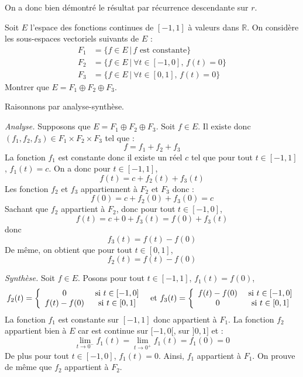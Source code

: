 \documentclass[a4paper,twoside,french,11pt]{VcCours}
\begin{document}
\medskip

On a donc bien démontré le résultat par récurrence descendante sur $r$.

\begin{Exercice}{} Soit $E$ l'espace des fonctions continues de $[-1,1]$ à valeurs dans $\mathbb{R}$. On considère les sous-espaces vectoriels suivants de $E$ :
\begin{align*}
F_1 &= \lbrace f \in E \, \vert \, f{\text{~est constante}} \rbrace \\
F_2 &= \lbrace f \in E \, \vert \ \forall t \in [ - 1,0], \,  f(t)  = 0 \rbrace \\
F_3 & = \lbrace f \in E \, \vert \ \forall t \in [0,1], \,  f(t) = 0 \rbrace 
\end{align*}
Montrer que $E = F_1 \oplus F_2 \oplus F_3$.
\end{Exercice} 


\corr Raisonnons par analyse-synthèse.

\medskip

\textit{Analyse.} Supposons que $E = F_1 \oplus F_2 \oplus F_3$. Soit $f \in E$. Il existe donc $(f_1,f_2,f_3) \in F_1 \times F_2 \times F_3$ tel que :
$$ f = f_1+ f_2+ f_3$$
La fonction $f_1$ est constante donc il existe un réel $c$ tel que pour tout $t \in [-1,1]$, $f_1(t)=c$. On a donc pour $t \in [-1,1]$,
$$ f(t) = c + f_2(t) + f_3(t)$$
Les fonction $f_2$ et $f_3$ appartiennent à $F_2$ et $F_3$ donc :
$$ f(0) = c + f_2(0)+ f_3(0) = c$$
Sachant que $f_2$ appartient à $F_2$, donc pour tout $t \in [-1,0]$,
$$f(t) = c + 0 + f_3(t) = f(0)+ f_3(t)$$
donc 
$$ f_3(t) = f(t)- f(0)$$
De même, on obtient que pour tout $t \in [0,1]$,
$$ f_2(t) = f(t)-f(0)$$

\medskip

\textit{Synthèse.} Soit $f \in E$. Posons pour tout $t \in [-1,1]$, $f_1(t) = f(0)$, 
$$ f_2(t) = \left\lbrace \begin{array}{ccl}
0 & \hbox{ si } t \in [-1,0] \\
f(t)-f(0) & \hbox{ si } t \in [0,1]
\end{array}\right. \; \hbox{ et } f_3(t) = \left\lbrace \begin{array}{ccl}
f(t)-f(0) & \hbox{ si } t \in [-1,0] \\
0 & \hbox{ si } t \in [0,1]
\end{array}\right.$$
La fonction $f_1$ est constante sur $[-1,1]$ donc appartient à $F_1$. La fonction $f_2$ appartient bien à $E$ car est continue sur $[-1,0[$, sur $]0,1]$ et :
$$ \lim_{t \rightarrow 0^{-}} f_1(t) =  \lim_{t \rightarrow 0^{+}} f_1(t) = f_1(0) = 0$$
De plus pour tout $t \in [-1,0]$, $f_1(t)=0$. Ainsi, $f_1$ appartient à $F_1$. On prouve de même que $f_2$ appartient à $F_2$. 
\end{document}
